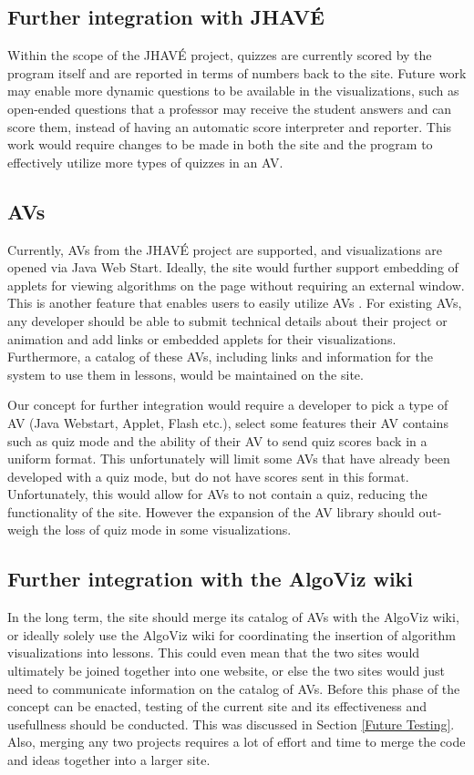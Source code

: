 \documentclass{acm_proc_article-sp}
\begin{document}
\subsection{Further integration with JHAV\'{E}}
Within the scope of the JHAV\'{E} project, quizzes are currently scored by the program itself and are reported in terms of numbers back to the site. Future work may enable more dynamic questions to be available in the visualizations, such as open-ended questions that a professor may receive the student answers and can score them, instead of having an automatic score interpreter and reporter.  This work would require changes to be made in both the site and the program to effectively utilize more types of quizzes in an AV.

\subsection{AVs}
\label{Future Development - AVs}
Currently, AVs from the JHAV\'{E} project are supported, and visualizations are opened via Java Web Start. Ideally, the site would further support embedding of applets for viewing algorithms on the page without requiring an external window. This is another feature that enables users to easily utilize AVs \cite{fortheweb}. For existing AVs, any developer should be able to submit technical details about their project or animation and add links or embedded applets for their visualizations. Furthermore, a catalog of these AVs, including links and information for the system to use them in lessons, would be maintained on the site.

Our concept for further integration would require a developer to pick a type of AV (Java Webstart, Applet, Flash etc.), select some features their AV contains such as quiz mode and the ability of their AV to send quiz scores back in a uniform format. This unfortunately will limit some AVs that have already been developed with a quiz mode, but do not have scores sent in this format. Unfortunately, this would allow for AVs to not contain a quiz, reducing the functionality of the site. However the expansion of the AV library should out-weigh the loss of quiz mode in some visualizations.

\subsection{Further integration with the AlgoViz wiki}
In the long term, the site should merge its catalog of AVs with the AlgoViz wiki, or ideally solely use the AlgoViz wiki for coordinating the insertion of algorithm visualizations into lessons. This could even mean that the two sites would ultimately be joined together into one website, or else the two sites would just need to communicate information on the catalog of AVs. Before this phase of the concept can be enacted, testing of the current site and its effectiveness and usefullness should be conducted. This was discussed in Section \ref{Future Testing}. Also, merging any two projects requires a lot of effort and time to merge the code and ideas together into a larger site.
\end{document}
